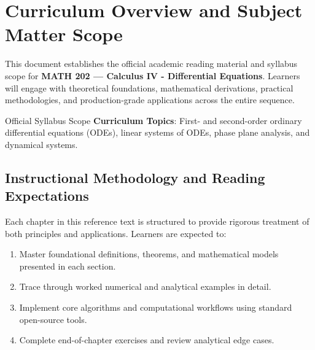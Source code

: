\section{Curriculum Overview and Subject Matter Scope}

This document establishes the official academic reading material and syllabus scope for \textbf{MATH 202 --- Calculus IV - Differential Equations}. Learners will engage with theoretical foundations, mathematical derivations, practical methodologies, and production-grade applications across the entire sequence.

\begin{InsightBox}{Official Syllabus Scope}
  \textbf{Curriculum Topics}: First- and second-order ordinary differential equations (ODEs), linear systems of ODEs, phase plane analysis, and dynamical systems.
\end{InsightBox}

\subsection{Instructional Methodology and Reading Expectations}

Each chapter in this reference text is structured to provide rigorous treatment of both principles and applications. Learners are expected to:
\begin{enumerate}
  \item Master foundational definitions, theorems, and mathematical models presented in each section.
  \item Trace through worked numerical and analytical examples in detail.
  \item Implement core algorithms and computational workflows using standard open-source tools.
  \item Complete end-of-chapter exercises and review analytical edge cases.
\end{enumerate}

